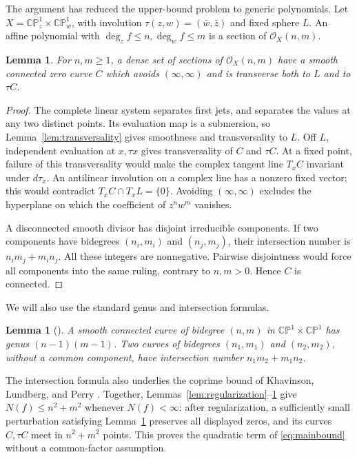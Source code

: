 \documentclass[a4paper]{amsart}
\newtheorem{lem}[thm]{Lemma}
\theoremstyle{remark}
\newcommand{\CP}{\mathbb {CP}}
\begin{document}
The argument has reduced the upper-bound problem to generic
polynomials. Let \(X=\CP^1_z\times\CP^1_w\), with involution
\(\tau(z,w)=(\bar w,\bar z)\) and fixed sphere \(L\).
An affine polynomial with \(\deg_z f\le n,\deg_w f\le m\)
is a section of \(\mathcal O_X(n,m)\).

\begin{lem}\label{lem:generic}
For \(n,m\ge1\), a dense set of sections of
\(\mathcal O_X(n,m)\) have a smooth connected zero curve \(C\)
which avoids \((\infty,\infty)\) and is transverse both to
\(L\) and to \(\tau C\).
\end{lem}

\begin{proof}
The complete linear system separates first jets, and separates
the values at any two distinct points. Its evaluation map is
a submersion, so Lemma~\ref{lem:transversality} gives smoothness
and transversality to \(L\).
Off \(L\), independent evaluation at \(x,\tau x\) gives
transversality of \(C\) and \(\tau C\).
At a fixed point, failure of this transversality would make
the complex tangent line \(T_xC\) invariant under \(d\tau_x\).
An antilinear involution on a complex line has a nonzero fixed
vector; this would contradict \(T_xC\cap T_xL=\{0\}\).
Avoiding \((\infty,\infty)\) excludes the hyperplane on which
the coefficient of \(z^nw^m\) vanishes.

A disconnected smooth divisor has disjoint irreducible
components. If two components have bidegrees
\((n_i,m_i)\) and \((n_j,m_j)\), their intersection number is
\(n_i m_j+m_i n_j\). All these integers are nonnegative.
Pairwise disjointness would force all components into the
same ruling, contrary to \(n,m>0\). Hence \(C\) is connected.
\end{proof}

We will also use the standard genus and intersection formulas.

\begin{lem}[{\cite[Chapter V, Proposition 1.5]{Har77}}]\label{lem:adjunction}
A smooth connected curve of bidegree \((n,m)\) in
\(\CP^1\times\CP^1\) has genus \((n-1)(m-1)\).
Two curves of bidegrees \((n_1,m_1)\) and \((n_2,m_2)\),
without a common component, have intersection number
\(n_1m_2+m_1n_2\).
\end{lem}

The intersection formula also underlies the coprime bound of
Khavinson, Lundberg, and Perry \cite[Proposition 1.10]{KLP24}.
Together, Lemmas~\ref{lem:regularization}--\ref{lem:adjunction}
give \(N(f)\le n^2+m^2\) whenever \(N(f)<\infty\):
after regularization, a sufficiently small perturbation
satisfying Lemma~\ref{lem:generic} preserves all displayed
zeros, and its curves \(C,\tau C\) meet in \(n^2+m^2\) points.
This proves the quadratic term of \eqref{eq:mainbound} without
a common-factor assumption.
\end{document}
